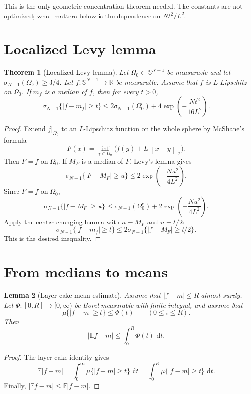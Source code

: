 \documentclass[11pt,oneside]{book}
\newtheorem{theorem}{Theorem}[chapter]
\newtheorem{lemma}[theorem]{Lemma}
\newcommand{\R}{\mathbb R}
\newcommand{\E}{\mathbb E}
\newcommand{\1}{\mathbf 1}
\newcommand{\dd}{\,\mathrm d}
\newcommand{\sphere}{\mathbb S}
\newcommand{\norm}[1]{\left\|#1\right\|}
\begin{document}
This is the only geometric concentration theorem needed.  The constants are
not optimized; what matters below is the dependence on \(Nt^2/L^2\).

\section{Localized Levy lemma}

\begin{theorem}[Localized Levy lemma]
Let \(\Omega_0\subset\sphere^{N-1}\) be measurable and let
\(\sigma_{N-1}(\Omega_0)\ge3/4\).  Let \(f:\sphere^{N-1}\to\R\) be measurable.
Assume that \(f\) is \(L\)-Lipschitz on \(\Omega_0\).  If \(m_f\) is a median
of \(f\), then for every \(t>0\),
\[
  \sigma_{N-1}\{|f-m_f|\ge t\}
  \le
  2\sigma_{N-1}(\Omega_0^c)
  +
  4\exp\left(-\frac{Nt^2}{16L^2}\right).
\]
\end{theorem}

\begin{proof}
Extend \(f|_{\Omega_0}\) to an \(L\)-Lipschitz function on the whole sphere by
McShane's formula
\[
  F(x)=\inf_{y\in\Omega_0}\bigl(f(y)+L\norm{x-y}_2\bigr).
\]
Then \(F=f\) on \(\Omega_0\).  If \(M_F\) is a median of \(F\), Levy's lemma
gives
\[
  \sigma_{N-1}\{|F-M_F|\ge u\}
  \le
  2\exp\left(-\frac{Nu^2}{4L^2}\right).
\]
Since \(F=f\) on \(\Omega_0\),
\[
  \sigma_{N-1}\{|f-M_F|\ge u\}
  \le
  \sigma_{N-1}(\Omega_0^c)
  +
  2\exp\left(-\frac{Nu^2}{4L^2}\right).
\]
Apply the center-changing lemma with \(a=M_F\) and \(u=t/2\):
\[
  \sigma_{N-1}\{|f-m_f|\ge t\}
  \le
  2\sigma_{N-1}\{|f-M_F|\ge t/2\}.
\]
This is the desired inequality.
\end{proof}

\section{From medians to means}

\begin{lemma}[Layer-cake mean estimate]
Assume that \(|f-m|\le R\) almost surely.  Let
\(\Phi:[0,R]\to[0,\infty)\) be Borel measurable with finite integral, and
assume that
\[
  \mu\{|f-m|\ge t\}\le \Phi(t)
  \qquad(0\le t\le R).
\]
Then
\[
  |\E f-m|
  \le
  \int_0^R\Phi(t)\,\dd t.
\]
\end{lemma}

\begin{proof}
The layer-cake identity gives
\[
  \E|f-m|
  =
  \int_0^\infty \mu\{|f-m|\ge t\}\,\dd t
  =
  \int_0^R \mu\{|f-m|\ge t\}\,\dd t.
\]
Finally, \(|\E f-m|\le\E|f-m|\).
\end{proof}
\end{document}
